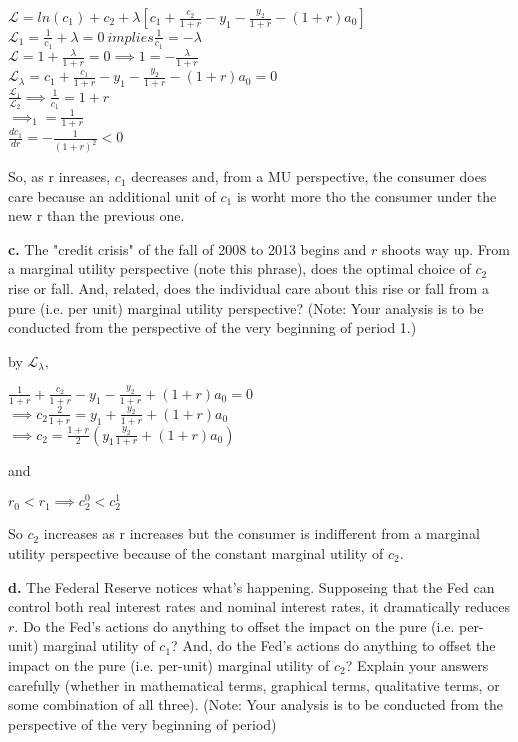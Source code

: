 \documentclass[11pt]{SelfArxOneColBMN}
\begin{document}
\begin{solution}
  \begin{center}
    $\mathcal{L} = ln(c_1) + c_2 + \lambda[c_1 + \frac{c_2}{1 + r} - y_1 - \frac{y_2}{1 + r} - (1 +r)a_0]$\\
    $\mathcal{L}_1 = \frac{1}{c_1} + \lambda = 0 \ implies \frac{1}{c_1} = -\lambda$\\
    $\mathcal{L} = 1 + \frac{\lambda}{1 + r} = 0 \implies 1 = -\frac{\lambda}{1 +r}$\\
    $\mathcal{L}_\lambda = c_1 + \frac{c_1}{1 + r} - y_1 - \frac{y_2}{1 + r} - (1 + r)a_0 = 0$\\
    $\frac{\mathcal{L}_1}{\mathcal{L}_2} \implies \frac{1}{c_1} = 1 + r$\\
    $\implies _1 = \frac{1}{1 + r}$\\
    $\frac{dc_1}{dr} = -\frac{1}{(1 + r)^2} < 0$
  \end{center}
  \noindent So, as r inreases, $c_1$ decreases and, from a MU perspective, the consumer does care because an additional unit of $c_1$ is worht more tho the consumer under the new r than the previous one. 
\end{solution}
\noindent \textbf{c.} The "credit crisis" of the fall of 2008 to 2013 begins and $r$ shoots way up. From a marginal utility perspective (note this phrase), does the optimal choice of $c_2$ rise or fall. And, related, does the individual care about this rise or fall from a pure (i.e. per unit) marginal utility perspective? (Note: Your analysis is to be conducted from the perspective of the very beginning of period 1.)\\
\begin{solution}
  by $\mathcal{L}_\lambda,$
  \begin{center}
    $\frac{1}{1 + r} + \frac{c_2}{1 + r} - y_1 - \frac{y_2}{1 + r} + (1 + r)a_0 = 0$\\
    $\implies c_2\frac{2}{1 + r} = y_1 + \frac{y_2}{1 + r} + (1 + r)a_0$\\
    $\implies c_2 = \frac{1 + r}{2}(y_1 \frac{y_2}{1 + r} + (1 + r)a_0)$
  \end{center}
  \noindent and
  \begin{center}
    $r_0 < r_1 \implies c_2^0 < c_2^1$
  \end{center}
  \noindent So $c_2$ increases as r increases but the consumer is indifferent from a marginal utility perspective because of the constant marginal utility of $c_2$.
\end{solution}
\noindent \textbf{d.} The Federal Reserve notices what's happening. Supposeing that the Fed can control both real interest rates and nominal interest rates, it dramatically reduces $r$. Do the Fed's actions do anything to offset the impact on the pure (i.e. per-unit) marginal utility of $c_1$? And, do the Fed's actions do anything to offset the impact on the pure (i.e. per-unit) marginal utility of $c_2$? Explain your answers carefully (whether in mathematical terms, graphical terms, qualitative terms, or some combination of all three). (Note: Your analysis is to be conducted from the perspective of the very beginning of period)\\
\end{document}
